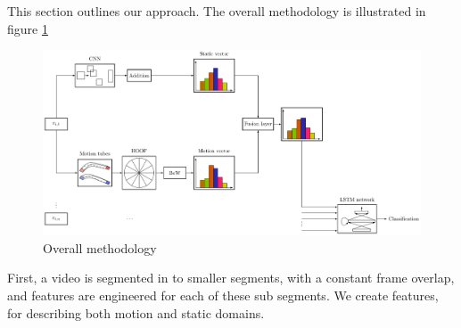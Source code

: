 

This section outlines our approach. The overall methodology is illustrated in figure \ref{fi:test}



\begin{figure}
  \centering
  \includegraphics[scale=0.7]{overall.pdf} 
  \caption{Overall methodology}\label{fi:test}
\end{figure}


First, a video is segmented in to smaller segments, with a constant frame overlap, and features are engineered for each of these sub segments. 
We create features, for describing both motion and static domains.

